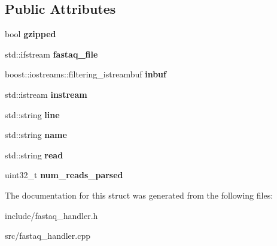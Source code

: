 \subsection*{Public Attributes}
\begin{DoxyCompactItemize}
\item 
\mbox{\label{structFastaqHandler_a8d8eadde1c5671a01dd773394fcb599c}} 
bool {\bfseries gzipped}
\item 
\mbox{\label{structFastaqHandler_ac7e538c0a6ee0c0a7f6891befff7f4f5}} 
std\+::ifstream {\bfseries fastaq\+\_\+file}
\item 
\mbox{\label{structFastaqHandler_ad2bcbd160e5eb33fc715ca8115fdae49}} 
boost\+::iostreams\+::filtering\+\_\+istreambuf {\bfseries inbuf}
\item 
\mbox{\label{structFastaqHandler_aec0d9c02bdcb2c8e8ec53a0d619d5bfb}} 
std\+::istream {\bfseries instream}
\item 
\mbox{\label{structFastaqHandler_a92aebfc73c1d2718b043dc8fbaa25911}} 
std\+::string {\bfseries line}
\item 
\mbox{\label{structFastaqHandler_aa5285b4e6cd34c0b882919d1d83dab92}} 
std\+::string {\bfseries name}
\item 
\mbox{\label{structFastaqHandler_a1430346cf566b06cd8449931cb8ecdb9}} 
std\+::string {\bfseries read}
\item 
\mbox{\label{structFastaqHandler_a06c2eaf692a00c4a6b8b5e96953d5865}} 
uint32\+\_\+t {\bfseries num\+\_\+reads\+\_\+parsed}
\end{DoxyCompactItemize}


The documentation for this struct was generated from the following files\+:\begin{DoxyCompactItemize}
\item 
include/fastaq\+\_\+handler.\+h\item 
src/fastaq\+\_\+handler.\+cpp\end{DoxyCompactItemize}
